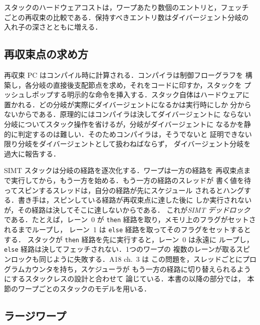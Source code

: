 \documentclass[../main.tex]{subfiles}
\begin{document}
スタックのハードウェアコストは，ワープあたり数個のエントリと，フェッチ
ごとの再収束の比較である．保持すべきエントリ数はダイバージェント分岐の
入れ子の深さとともに増える．

\subsection{再収束点の求め方}

再収束 PC はコンパイル時に計算される．コンパイラは制御フローグラフを
構築し，各分岐の直接後支配節点を求め，それをコードに印すか，スタックを
プッシュしポップする明示的な命令を挿入する．スタック自体はハードウェアに
置かれる．どの分岐が実際にダイバージェントになるかは実行時にしか
分からないからである．原理的にはコンパイラは決してダイバージェントに
ならない分岐についてスタック操作を省けるが，分岐がダイバージェントに
なるかを静的に判定するのは難しい．そのためコンパイラは，そうでないと
証明できない限り分岐をダイバージェントとして扱わねばならず，
ダイバージェント分岐を過大に報告する．

\begin{note}
  SIMT スタックは分岐の経路を逐次化する．ワープは一方の経路を
  再収束点まで実行してから，もう一方を始める．もう一方の経路のスレッドが
  書く値を待ってスピンするスレッドは，自分の経路が先にスケジュール
  されるとハングする．書き手は，スピンしている経路が再収束点に達した後に
  しか実行されないが，その経路は決してそこに達しないからである．
  これが\emph{SIMT デッドロック}である．たとえば，レーン~0 が
  \texttt{then} 経路を取り，メモリ上のフラグがセットされるまでループし，
  レーン~1 は \texttt{else} 経路を取ってそのフラグをセットするとする．
  スタックが \texttt{then} 経路を先に実行すると，レーン~0 は永遠に
  ループし，\texttt{else} 経路は決してフェッチされない．1つのワープの
  複数のレーンが取るスピンロックも同じように失敗する．A18 ch.~3 は
  この問題を，スレッドごとにプログラムカウンタを持ち，スケジューラが
  もう一方の経路に切り替えられるようにするスタックレスの設計と合わせて
  論じている．本書の以降の部分では，
  本節のワープごとのスタックのモデルを用いる．
\end{note}

\subsection{ラージワープ}
\end{document}
